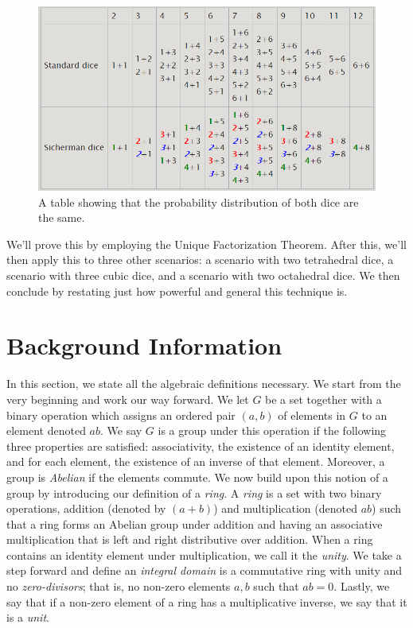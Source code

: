 \documentclass[12pt]{report}
\begin{document}
\begin{figure}[h]
  \includegraphics[width=\linewidth]{images/wikipedia_table.png}
  \caption{A table showing that the probability distribution of both dice are the same.}
  \label{fig:wikipedia_table}
\end{figure}

We'll prove this by employing the Unique Factorization Theorem. After this, we'll then apply this to three
other scenarios: a scenario with two tetrahedral dice, a scenario with three cubic dice, and a scenario with
two octahedral dice. We then conclude by restating just how powerful and general this technique is.


\section*{Background Information}
In this section, we state all the algebraic definitions necessary. We start from the very beginning and work
our way forward. We let $G$ be a set together with a binary operation which assigns an ordered pair $(a,b)$ of
elements in $G$ to an element denoted $ab$. We say $G$ is a group under this operation if the following three
properties are satisfied: associativity, the existence of an identity element, and for each element, the
existence of an inverse of that element. Moreover, a group is \textit{Abelian} if the elements commute. We now
build upon this notion of a group by introducing our definition of a \textit{ring}. A \textit{ring} is a set
with two binary operations, addition (denoted by $(a+b)$) and multiplication (denoted $ab$) such that a ring
forms an Abelian group under addition and having an associative multiplication that is left and right
distributive over addition. When a ring contains an identity element under multiplication, we call it the
\textit{unity}. We take a step forward and define an \textit{integral domain} is a commutative ring with unity
and no \textit{zero-divisors}; that is, no non-zero elements $a,b$ such that $ab=0$. Lastly, we say that if a
non-zero element of a ring has a multiplicative inverse, we say that it is a \textit{unit}.
\end{document}
